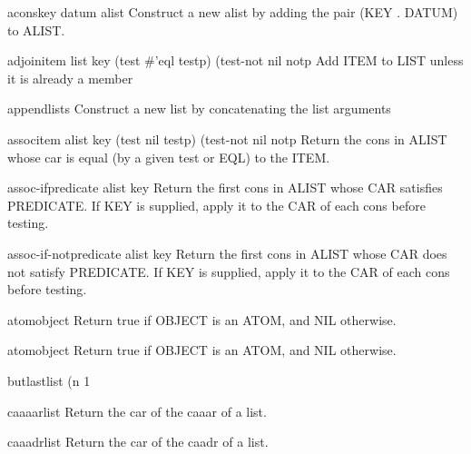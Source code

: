 \begin{function}{acons}{key datum alist}{}
  Construct a new alist by adding the pair (KEY . DATUM) to ALIST.
\end{function}

\begin{function}{adjoin}{item list \key key (test #'eql testp) (test-not nil notp}{}
  Add ITEM to LIST unless it is already a member
\end{function}

\begin{function}{append}{\rest lists}{}
  Construct a new list by concatenating the list arguments
\end{function}

\begin{function}{assoc}{item alist \key key (test nil testp) (test-not nil notp}{}
  Return the cons in ALIST whose car is equal (by a given test or EQL) to
   the ITEM.
\end{function}

\begin{function}{assoc-if}{predicate alist \key key}{}
  Return the first cons in ALIST whose CAR satisfies PREDICATE. If
   KEY is supplied, apply it to the CAR of each cons before testing.
\end{function}

\begin{function}{assoc-if-not}{predicate alist \key key}{}
  Return the first cons in ALIST whose CAR does not satisfy PREDICATE.
  If KEY is supplied, apply it to the CAR of each cons before testing.
\end{function}

\begin{function}{atom}{object}{}
  Return true if OBJECT is an ATOM, and NIL otherwise.
\end{function}

\begin{type}{atom}{object}{}
  Return true if OBJECT is an ATOM, and NIL otherwise.
\end{type}

\begin{function}{butlast}{list \op (n 1}{}
  
\end{function}

\begin{accessor}{caaaar}{list}{}
  Return the car of the caaar of a list.
\end{accessor}

\begin{accessor}{caaadr}{list}{}
  Return the car of the caadr of a list.
\end{accessor}

